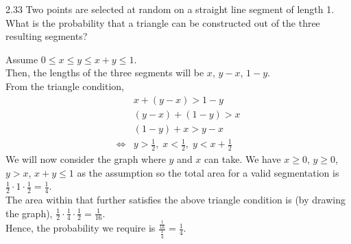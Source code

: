 \documentclass[12pt, a4paper]{article}
\begin{document}
\begin{prob}{2.33}
    Two points are selected at random on a straight line segment of length 1. What is the probability that a triangle can be constructed out of the three resulting segments?
\end{prob}
\begin{sol}
    Assume $ 0 \leq x \leq y \leq x + y \leq 1$. \\
    Then, the lengths of the three segments will be $x$, $y-x$, $1-y$. \\
    From the triangle condition, 
    \begin{align*}
        &x + (y-x) > 1-y \\
        &(y-x) + (1-y) > x \\
        &(1-y) + x > y-x \\
        \iff & y > \frac{1}{2}, \; x < \frac{1}{2}, \; y < x + \frac{1}{2}
    \end{align*}
    We will now consider the graph where $y$ and $x$ can take. We have $x \geq 0$, $y \geq 0$, $y > x$, $x + y \leq 1$ as the assumption so the total area for a valid segmentation is $\frac{1}{2} \cdot 1 \cdot \frac{1}{2} = \frac{1}{4} $. \\
    The area within that further satisfies the above triangle condition is (by drawing the graph), $\frac{1}{2} \cdot \frac{1}{4} \cdot \frac{1}{2} = \frac{1}{16}$. \\
    Hence, the probability we require is $\frac{\frac{1}{16}}{\frac{1}{4}} = \frac{1}{4}$.
\end{sol}
\bigskip
\end{document}
